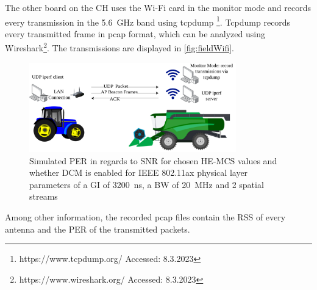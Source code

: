 The other board on the \ac{CH} uses the Wi-Fi card in the monitor mode and records every transmission in the \SI{5.6}{\giga\hertz} band using tcpdump \footnote{https://www.tcpdump.org/ Accessed: 8.3.2023}.
Tcpdump records every transmitted frame in pcap format, which can be analyzed using Wireshark\footnote{https://www.wireshark.org/ Accessed: 8.3.2023}.
The transmissions are displayed in \autoref{fig:fieldWifi}.
\begin{figure}[]%
	\centering
	\includegraphics[width=0.8\textwidth]{figures/FieldExperimentwifi}
	\caption{Simulated \ac{PER} in regards to \ac{SNR} for chosen HE-\ac{MCS} values and whether \ac{DCM} is enabled for IEEE 802.11ax physical layer parameters of a \ac{GI} of \SI{3200}{\nano\second}, a \ac{BW} of \SI{20}{\mega\hertz} and 2 spatial streams}%
	\label{fig:fieldWifi}%
\end{figure}
Among other information, the recorded pcap files contain the \ac{RSS} of every antenna and the \ac{PER} of the transmitted packets.